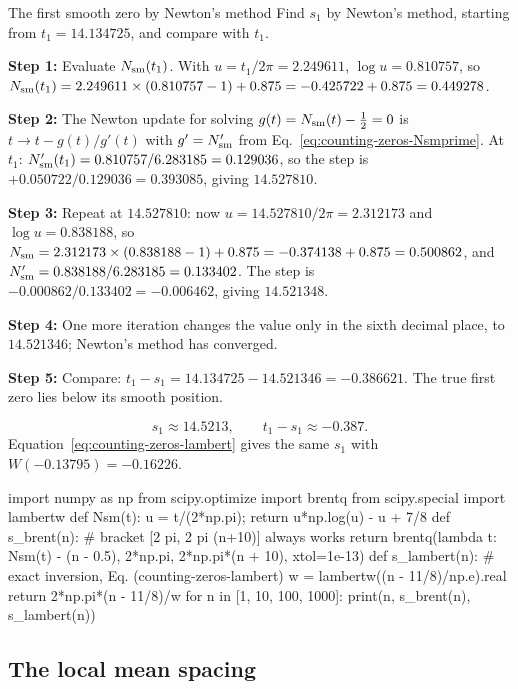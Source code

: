 \begin{sample}{The first smooth zero by Newton's method}
Find $s_1$ by Newton's method, starting from $t_1=14.134725$, and compare with $t_1$.

\textbf{Step 1:} Evaluate $N_{\mathrm{sm}}(t_1)$. With $u=t_1/2\pi=2.249611$, $\log u=0.810757$, so $N_{\mathrm{sm}}(t_1)=2.249611\times(0.810757-1)+0.875=-0.425722+0.875=0.449278$.

\textbf{Step 2:} The Newton update for solving $g(t)=N_{\mathrm{sm}}(t)-\tfrac12=0$ is $t\to t-g(t)/g'(t)$ with $g'=N_{\mathrm{sm}}'$ from Eq.~\eqref{eq:counting-zeros-Nsmprime}. At $t_1$: $N_{\mathrm{sm}}'(t_1)=0.810757/6.283185=0.129036$, so the step is $+0.050722/0.129036=0.393085$, giving $14.527810$.

\textbf{Step 3:} Repeat at $14.527810$: now $u=14.527810/2\pi=2.312173$ and $\log u=0.838188$, so $N_{\mathrm{sm}}=2.312173\times(0.838188-1)+0.875=-0.374138+0.875=0.500862$, and $N_{\mathrm{sm}}'=0.838188/6.283185=0.133402$. The step is $-0.000862/0.133402=-0.006462$, giving $14.521348$.

\textbf{Step 4:} One more iteration changes the value only in the sixth decimal place, to $14.521346$; Newton's method has converged.

\textbf{Step 5:} Compare: $t_1-s_1=14.134725-14.521346=-0.386621$. The true first zero lies below its smooth position.

\[
\boxed{s_1\approx14.5213,\qquad t_1-s_1\approx-0.387.}
\]
Equation~\eqref{eq:counting-zeros-lambert} gives the same $s_1$ with $W(-0.13795)=-0.16226$.
\end{sample}

\begin{pycode}
import numpy as np
from scipy.optimize import brentq
from scipy.special import lambertw
def Nsm(t):
    u = t/(2*np.pi); return u*np.log(u) - u + 7/8
def s_brent(n):          # bracket [2 pi, 2 pi (n+10)] always works
    return brentq(lambda t: Nsm(t) - (n - 0.5), 2*np.pi, 2*np.pi*(n + 10),
                  xtol=1e-13)
def s_lambert(n):        # exact inversion, Eq. (counting-zeros-lambert)
    w = lambertw((n - 11/8)/np.e).real
    return 2*np.pi*(n - 11/8)/w
for n in [1, 10, 100, 1000]:
    print(n, s_brent(n), s_lambert(n))
\end{pycode}

\subsection{The local mean spacing}

